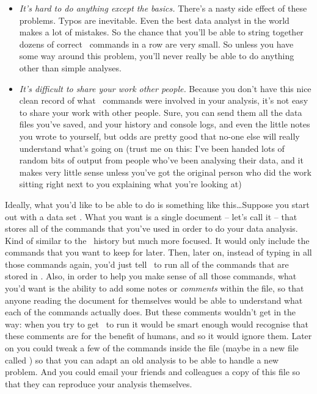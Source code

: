 \begin{itemize}
\item{\it  It's hard to do anything except the basics.} There's a nasty side effect of these problems. Typos are inevitable. Even the best data analyst in the world makes a lot of mistakes. So the chance that you'll be able to string together dozens of correct \R\ commands in a row are very small. So unless you have some way around this problem, you'll never really be able to do anything other than simple analyses. 

\item {\it It's difficult to share your work other people.} Because you don't have this nice clean record of what \R\ commands were involved in your analysis, it's not easy to share your work with other people. Sure, you can send them all the data files you've saved, and your history and console logs, and even the little notes you wrote to yourself, but odds are pretty good that no-one else will really understand what's going on (trust me on this: I've been handed lots of random bits of output from people who've been analysing their data, and it makes very little sense unless you've got the original person who did the work sitting right next to you explaining what you're looking at)
\end{itemize}

Ideally, what you'd like to be able to do is something like this\ldots Suppose you start out with a data set . What you want is a single document -- let's call it  -- that stores all of the commands that you've used in order to do your data analysis. Kind of similar to the \R\ history but much more focused. It would only include the commands that you want to keep for later. Then, later on, instead of typing in all those commands again, you'd just tell \R\ to run all of the commands that are stored in . Also, in order to help you make sense of all those commands, what you'd want is the ability to add some notes or {\it comments} within the file, so that anyone reading the document for themselves would be able to understand what each of the commands actually does. But these comments wouldn't get in the way: when you try to get \R\ to run  it would be smart enough would recognise that these comments are for the benefit of humans, and so it would ignore them. Later on you could tweak a few of the commands inside the file (maybe in a new file called ) so that you can adapt an old analysis to be able to handle a new problem. And you could email your friends and colleagues a copy of this file so that they can reproduce your analysis themselves. 

